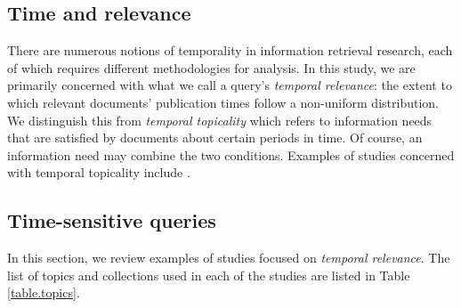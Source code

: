 \documentclass{sig-alternate}
\begin{document}
\subsection{Time and relevance}

There are numerous notions of temporality in information retrieval research, each of which requires different methodologies for analysis. In this study, we are primarily concerned with what we call a query's \emph{temporal relevance}: the extent to which relevant documents' publication times follow a non-uniform distribution. We distinguish this from \emph{temporal topicality} which refers to information needs that are satisfied by documents about certain periods in time. Of course, an information need may combine the two conditions. Examples of studies concerned with temporal topicality include \cite{Berberich2010,Kanhabua2011}.

\subsection{Time-sensitive queries}

In this section, we review examples of studies focused on \emph{temporal relevance}.  The list of topics and collections used in each of the studies are listed in Table \ref{table.topics}. 

\begin{table}
\small
{}
\caption{TREC topics and Collections Used in Prior Temporal Retrieval Studies.}
\label{table.topics}
\end{table}
\end{document}
